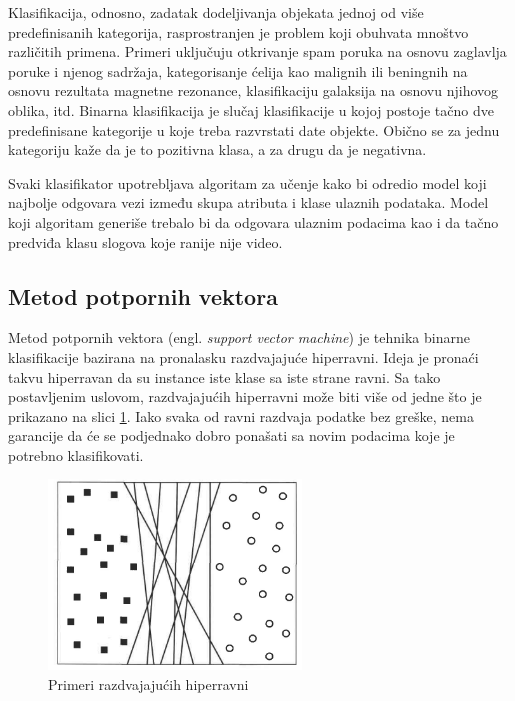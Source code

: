 Klasifikacija, odnosno, zadatak dodeljivanja objekata jednoj od više predefinisanih kategorija, rasprostranjen je problem koji obuhvata mnoštvo različitih primena. Primeri uključuju otkrivanje spam poruka na osnovu zaglavlja poruke i njenog sadržaja, kategorisanje ćelija kao malignih ili beningnih na osnovu rezultata magnetne rezonance, klasifikaciju galaksija na osnovu njihovog oblika, itd. Binarna klasifikacija je slučaj klasifikacije u kojoj postoje tačno dve predefinisane kategorije u koje treba razvrstati date objekte. Obično se za jednu kategoriju kaže da je to pozitivna klasa, a za drugu da je negativna.

Svaki klasifikator upotrebljava algoritam za učenje kako bi odredio model koji najbolje odgovara vezi između skupa atributa i klase ulaznih podataka. Model koji algoritam generiše trebalo bi da odgovara ulaznim podacima kao i da tačno predviđa klasu slogova koje ranije nije video. 


\subsection{Metod potpornih vektora} 

Metod potpornih vektora (engl. \textit{support vector machine}) je tehnika binarne klasifikacije bazirana na pronalasku razdvajajuće hiperravni. Ideja je pronaći takvu hiperravan da su instance iste klase sa iste strane ravni. Sa tako postavljenim uslovom, razdvajajućih hiperravni može biti više od jedne što je prikazano na slici \ref{fig:svm1}. Iako svaka od ravni razdvaja podatke bez greške, nema garancije da će se podjednako dobro ponašati sa novim podacima koje je potrebno klasifikovati. 


\begin{figure}[H]
	\centering
	\includegraphics[width=0.6\textwidth]{Figures/svm1.png}
	\caption{Primeri razdvajajućih hiperravni \cite{introDM}}
	\label{fig:svm1}
\end{figure}


